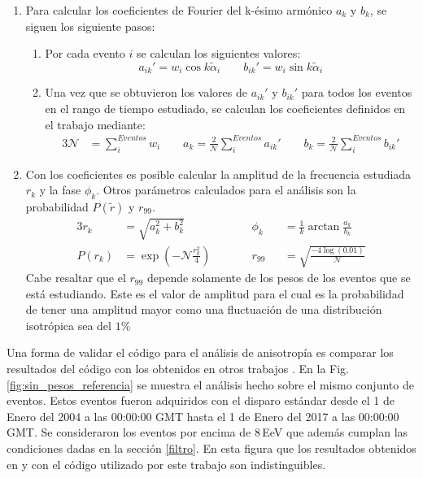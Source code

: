 \begin{enumerate}
        \item Para calcular los coeficientes de Fourier del k-ésimo armónico $a_k$ y $b_k$, se siguen los siguiente pasos:
        \begin{enumerate}
          \item Por cada evento  $i$ se calculan los siguientes valores:
          \begin{equation}
             a_{ik}' = {w_i}\cos k\tilde{\alpha}_i \qquad
             b_{ik}' = {w_i}\sin k\tilde{\alpha}_i
         \end{equation}
         \item Una vez que se obtuvieron los valores de $a_{ik}'$ y $b_{ik}'$ para todos los eventos en el rango de tiempo estudiado, se calculan los coeficientes definidos en el trabajo \cite{analisis_fourier} mediante:
         \begin{alignat}{3}
          \mathcal{N} &= \sum^{Eventos}_i w_i \qquad
            a_k = \frac{2}{\mathcal{N}} \sum^{Eventos}_i a_{ik}' \qquad
            b_k = \frac{2}{\mathcal{N}} \sum^{Eventos}_i b_{ik}'  
         \end{alignat}
        \end{enumerate}
        \item Con los coeficientes es posible calcular la amplitud de la frecuencia estudiada ${r}_k$ y la fase $\phi_k$. Otros parámetros calculados para el análisis son la probabilidad $P(\tilde{r})$  y $r_{99}$. 
        \begin{alignat}{3}
            {r}_k &= \sqrt{a_k^2 +b_k^2}                       \qquad &&   \phi_k&&= \frac{1}{k}\arctan\frac{a_k}{b_k}\\
          P({r}_k)&= \exp(-\mathcal{N}\frac{{r}_k^2}{4})\qquad &&   r_{99}&&= \sqrt{\frac{-4\log(0.01)}{\mathcal{N}}}
        \end{alignat}
        Cabe resaltar que el $r_{99}$ depende solamente de los pesos de los eventos que se está estudiando. Este es el valor de amplitud para el cual es la probabilidad de tener una amplitud mayor como una fluctuación de una distribución isotrópica sea del $1$\%
      \end{enumerate}

    Una forma de validar el código para el análisis de anisotropía es comparar los resultados del código con los obtenidos en otros trabajos \cite{taborda}. En la Fig.\ref{fig:sin_pesos_referencia} se muestra el análisis hecho sobre el mismo conjunto de eventos. Estos eventos fueron adquiridos con el disparo estándar desde el 1 de Enero del 2004 a las 00:00:00 GMT  hasta el 1 de Enero del 2017 a las 00:00:00 GMT. Se consideraron los eventos por encima de $8\,$EeV que además cumplan las condiciones dadas en la sección \ref{filtro}.  En esta figura que los resultados obtenidos en \cite{taborda} y con el código utilizado por este trabajo son indistinguibles. 

